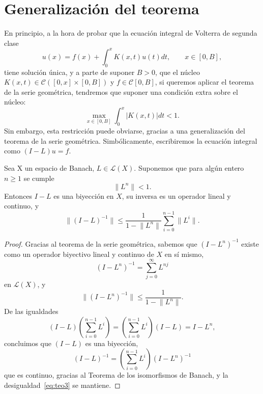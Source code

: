 \section{Generalización del teorema}
En principio, a la hora de probar que la ecuación integral de Volterra de segunda clase
\begin{equation}
	u(x) = f(x) + \int_{0}^{x} K(x,t)u(t)dt, \qquad x \in [0,B],
\end{equation}
tiene solución única, y a parte de suponer $B > 0$, que el núcleo $K(x,t) \in \mathcal{C}([0,x]\times[0,B])$ y $f \in \mathcal{C}[0,B]$, si queremos aplicar el teorema de la serie geométrica, tendremos que suponer una condición extra sobre el núcleo:
\begin{equation}
	\max_{x\in [0,B]}\int_{0}^{x} |K(x,t)|dt < 1.
\end{equation}
Sin embargo, esta restricción puede obviarse, gracias a una generalización del teorema de la serie geométrica. Simbólicamente, escribiremos la ecuación integral como $(I-L)u = f$.
\begin{corolario}\label{corolario}
	Sea X un espacio de Banach, $L \in \mathcal{L}(X)$. Suponemos que para algún entero $n \geqslant 1$ se cumple
	\begin{equation}
		\lVert L^n \rVert < 1.
	\end{equation}
	Entonces $I - L$ es una biyección en $X$, su inversa es un operador lineal y continuo, y 
	\begin{equation}\label{eq:teo3}
		\lVert (I-L)^{-1} \rVert \leqslant \dfrac{1}{1 - \lVert L^n \rVert} \sum_{i=0}^{n - 1}\lVert L^i \rVert.
	\end{equation}
\end{corolario}
\begin{proof}
	Gracias al teorema de la serie geométrica, sabemos que $(I-L^n)^{-1}$ existe como un operador biyectivo lineal y continuo de $X$ en sí mismo,
	\begin{equation}
		(I - L^n)^{-1} = \sum_{j=0}^{\infty}L^{nj} 
	\end{equation}
	en $\mathcal{L}(X)$, y
	\begin{equation}
		\lVert (I - L^n)^{-1} \rVert \leqslant \dfrac{1}{1 - \lVert L^n \rVert}.
	\end{equation}
	De las igualdades
	\begin{equation}
		(I - L)(\sum_{i=0}^{n - 1}L^i) = (\sum_{i=0}^{n - 1}L^i)(I-L) = I - L^n,
	\end{equation}
	concluimos que $(I-L)$ es una biyección,
	\begin{equation}
		(I-L)^{-1} = (\sum_{i=0}^{n-1}L^i)(I-L^n)^{-1}
	\end{equation}
	que es continuo, gracias al Teorema de los isomorfismos de Banach, y la desigualdad~\eqref{eq:teo3} se mantiene.
\end{proof}
